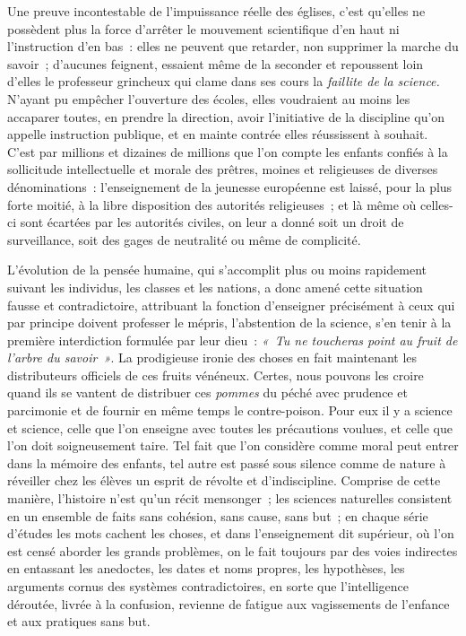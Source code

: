 \documentclass[french,twoside]{book} %
\begin{document}
Une preuve incontestable de l’impuissance réelle des églises, c’est qu’elles ne possèdent plus la force d’arrêter le mouvement scientifique d’en haut ni l’instruction d’en bas : elles ne peuvent que retarder, non supprimer la marche  du savoir ; d’aucunes feignent, essaient même de la seconder et repoussent loin d’elles le professeur grincheux qui clame dans ses cours la \emph{faillite de la science.} N’ayant pu empêcher l’ouverture des écoles, elles voudraient au moins les accaparer toutes, en prendre la direction, avoir l’initiative de la discipline qu’on appelle instruction publique, et en mainte contrée elles réussissent à souhait. C’est par millions et dizaines de millions que l’on compte les enfants confiés à la sollicitude intellectuelle et morale des prêtres, moines et religieuses de diverses dénominations : l’enseignement de la jeunesse européenne est laissé, pour la plus forte moitié, à la libre disposition des autorités religieuses ; et là même où celles-ci sont écartées par  les autorités civiles, on leur a donné soit un droit de surveillance, soit des gages de neutralité ou même de complicité.\par
L’évolution de la pensée humaine, qui s’accomplit plus ou moins rapidement suivant les individus, les classes et les nations, a donc amené cette situation fausse et contradictoire, attribuant la fonction d’enseigner précisément à ceux qui par principe doivent professer le mépris, l’abstention de la science, s’en tenir à la première interdiction formulée par leur dieu : \emph{« Tu ne toucheras point au fruit de l’arbre du savoir »}. La prodigieuse ironie des choses en fait maintenant les distributeurs officiels de ces fruits vénéneux. Certes, nous pouvons les croire quand ils se vantent de distribuer ces \emph{pommes}  du péché avec prudence et parcimonie et de fournir en même temps le contre-poison. Pour eux il y a science et science, celle que l’on enseigne avec toutes les précautions voulues, et celle que l’on doit soigneusement taire. Tel fait que l’on considère comme moral peut entrer dans la mémoire des enfants, tel autre est passé sous silence comme de nature à réveiller chez les élèves un esprit de révolte et d’indiscipline. Comprise de cette manière, l’histoire n’est qu’un récit mensonger ; les sciences naturelles consistent en un ensemble de faits sans cohésion, sans cause, sans but ; en chaque série d’études les mots cachent les choses, et dans l’enseignement dit supérieur, où l’on est censé aborder les grands problèmes, on le  fait toujours par des voies indirectes en entassant les anedoctes, les dates et noms propres, les hypothèses, les arguments cornus des systèmes contradictoires, en sorte que l’intelligence déroutée, livrée à la confusion, revienne de fatigue aux vagissements de l’enfance et aux pratiques sans but.\par
\end{document}
